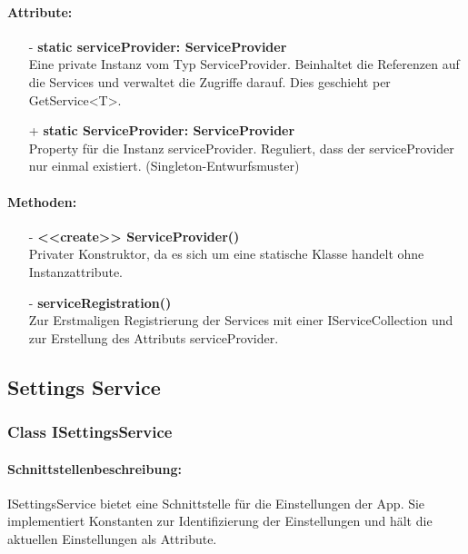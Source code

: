 \documentclass[a4paper,12pt]{article}
\begin{document}
	\paragraph{Attribute:}
	\begin{itemize}
		\item[-] \textbf{static serviceProvider: ServiceProvider}\\Eine private Instanz vom Typ ServiceProvider. Beinhaltet die Referenzen auf die Services und verwaltet die Zugriffe darauf. Dies geschieht per GetService<T>.
		\item[+] \textbf{static ServiceProvider: ServiceProvider}\\Property für die Instanz serviceProvider. Reguliert, dass der serviceProvider nur einmal existiert. (Singleton-Entwurfsmuster)

	\end{itemize}
	\paragraph{Methoden:}
	\begin{itemize}
		\item[-] \textbf{<<create>> ServiceProvider()}\\Privater Konstruktor, da es sich um eine statische Klasse handelt ohne Instanzattribute.
		\item[-] \textbf{serviceRegistration()}\\ Zur Erstmaligen Registrierung der Services mit einer IServiceCollection und zur Erstellung des Attributs serviceProvider.\\
	\end{itemize}
		
		
		
		
		
\subsection{Settings Service}
\subsubsection{Class ISettingsService}
	\paragraph{Schnittstellenbeschreibung:}
	ISettingsService bietet eine Schnittstelle für die Einstellungen der App. Sie implementiert Konstanten zur Identifizierung der Einstellungen und hält die aktuellen Einstellungen als Attribute.
\end{document}
